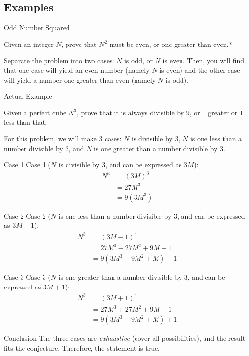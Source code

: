 \subsection{Examples}
\begin{namedframe}{Odd Number Squared}
	\begin{example}
		Given an integer $N$, prove that $N^2$ must be even, or one greater than even.*	
	\end{example}
	\pause
	Separate the problem into two cases: $N$ is odd, or $N$ is even. Then, you will find that one case will yield an even number (namely $N$ is even) and the other case will yield a number one greater than even (namely $N$ is odd).
\end{namedframe}
\begin{namedframe}{Actual Example}
	\begin{example}
		Given a perfect cube $N^3$, prove that it is always divisible by 9, or 1 greater or 1 less than that.
	\end{example}
	\pause
	For this problem, we will make 3 cases: $N$ is divisible by 3, $N$ is one less than a number divisible by 3, and $N$ is one greater than a number divisible by 3.
\end{namedframe}
\begin{namedframe}{Case 1}
	Case 1 ($N$ is divisible by 3, and can be expressed as $3M$):
	\pause
	\begin{align*}
		N^3 &= (3M)^3\\
			&= 27M^3\\
			&= 9(3M^3)
	\end{align*}
\end{namedframe}
\begin{namedframe}{Case 2}
	Case 2 ($N$ is one less than a number divisible by 3, and can be expressed as $3M-1$):
	\pause
	\begin{align*}
		N^3 &= (3M-1)^3\\
		&= 27M^3-27M^2+9M-1\\
		&= 9(3M^3-9M^2+M)-1
	\end{align*}
\end{namedframe}
\begin{namedframe}{Case 3}
	Case 3 ($N$ is one greater than a number divisible by 3, and can be expressed as $3M+1$):
	\pause
	\begin{align*}
		N^3 &= (3M+1)^3\\
		&= 27M^3+27M^2+9M+1\\
		&= 9(3M^3+9M^2+M)+1
	\end{align*}
\end{namedframe}
\begin{namedframe}{Conclusion}
	The three cases are \textit{exhaustive} (cover all possibilities), and the result fits the conjecture. Therefore, the statement is true.
\end{namedframe}